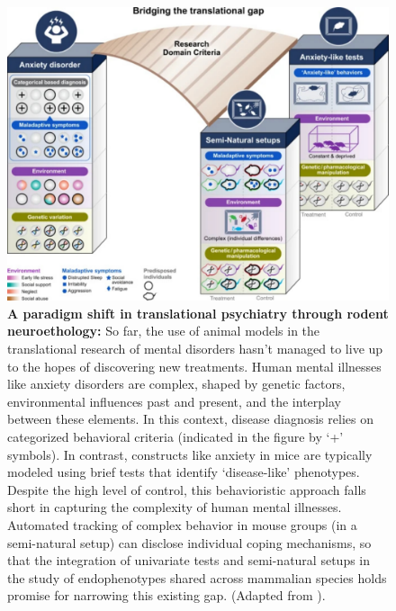 \begin{figure}[!thb]
\centering
\includegraphics[width=\textwidth]{Figures/intro_7.pdf}

\caption[\textbf{A paradigm shift in translational psychiatry through rodent neuroethology}]{\textbf{A paradigm shift in translational psychiatry through rodent neuroethology:} So far, the use of animal models in the translational research of mental disorders hasn't managed to live up to the hopes of discovering new treatments. Human mental illnesses like anxiety disorders are complex, shaped by genetic factors, environmental influences past and present, and the interplay between these elements. In this context, disease diagnosis relies on categorized behavioral criteria (indicated in the figure by `+' symbols). In contrast, constructs like anxiety in mice are typically modeled using brief tests that identify `disease-like' phenotypes. Despite the high level of control, this behavioristic approach falls short in capturing the complexity of human mental illnesses. Automated tracking of complex behavior in mouse groups (in a semi-natural setup) can disclose individual coping mechanisms, so that the integration of univariate tests and semi-natural setups in the study of endophenotypes shared across mammalian species holds promise for narrowing this existing gap. (Adapted from \cite{Shemesh2023ANeuroethology}).}
\label{fig:1.7}

\end{figure}


